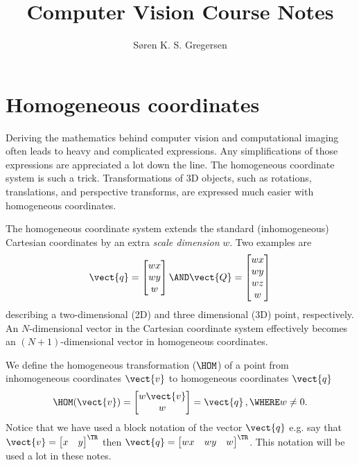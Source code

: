 \documentclass[oneandhalfcolumn]{coursenotes-handout}
\title{Computer Vision Course Notes}
\author{Søren K. S. Gregersen}
\affiliation{DTU Compute}
\begin{document}
\maketitle

\section{Homogeneous coordinates}
Deriving the mathematics behind computer vision and computational imaging often leads to heavy and complicated expressions. Any simplifications of those expressions are appreciated a lot down the line. The homogeneous coordinate system is such a trick. Transformations of 3D objects, such as rotations, translations, and perspective transforms, are expressed much easier with homogeneous coordinates.%
%

The homogeneous coordinate system extends the standard (inhomogeneous) Cartesian coordinates by an extra \emph{scale dimension} \(w\). Two examples are
\begin{align}
  \vect{q} = \begin{bmatrix} w x \\ w y \\ w \end{bmatrix} \AND
  \vect{Q} = \begin{bmatrix} w x \\ w y \\ w z \\ w \end{bmatrix}
\end{align}
describing a two-dimensional (2D) and three dimensional (3D) point, respectively. An \(N\)-dimensional vector in the Cartesian coordinate system effectively becomes an \((N+1)\)-dimensional vector in homogeneous coordinates.

We define the homogeneous transformation (\( \HOM \)) of a point from inhomogeneous coordinates \(\vect{v}\) to homogeneous coordinates \(\vect{q}\)
\begin{align}
    \HOM(\vect{v}) = \begin{bmatrix} w \vect{v} \\ w \end{bmatrix} = \vect{q} \,, \WHERE w \neq 0. \label{eq:hom.def}
\end{align}
Notice that we have used a block notation of the vector \(\vect{q}\) e.g. say that \(\vect{v} = \begin{bmatrix} x & y \end{bmatrix}^{\TR}\) then \(\vect{q} = \begin{bmatrix} w x & w y & w \end{bmatrix}^{\TR}\). This notation will be used a lot in these notes.
\end{document}
